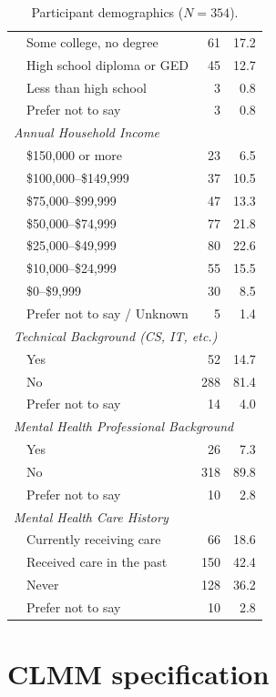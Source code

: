 \documentclass[letterpaper,twocolumn,10pt]{article}
\begin{document}
\begin{table}[htbp]
\begin{tabular}{llrr}
 & Some college, no degree & 61 & 17.2 \\
 & High school diploma or GED & 45 & 12.7 \\
 & Less than high school & 3 & 0.8 \\
 & Prefer not to say & 3 & 0.8 \\
\midrule
\multicolumn{4}{l}{\textit{Annual Household Income}} \\
 & \$150,000 or more & 23 & 6.5 \\
 & \$100,000--\$149,999 & 37 & 10.5 \\
 & \$75,000--\$99,999 & 47 & 13.3 \\
 & \$50,000--\$74,999 & 77 & 21.8 \\
 & \$25,000--\$49,999 & 80 & 22.6 \\
 & \$10,000--\$24,999 & 55 & 15.5 \\
 & \$0--\$9,999 & 30 & 8.5 \\
 & Prefer not to say / Unknown & 5 & 1.4 \\
\midrule
\multicolumn{4}{l}{\textit{Technical Background (CS, IT, etc.)}} \\
 & Yes & 52 & 14.7 \\
 & No & 288 & 81.4 \\
 & Prefer not to say & 14 & 4.0 \\
\midrule
\multicolumn{4}{l}{\textit{Mental Health Professional Background}} \\
 & Yes & 26 & 7.3 \\
 & No & 318 & 89.8 \\
 & Prefer not to say & 10 & 2.8 \\
\midrule
\multicolumn{4}{l}{\textit{Mental Health Care History}} \\
 & Currently receiving care & 66 & 18.6 \\
 & Received care in the past & 150 & 42.4 \\
 & Never & 128 & 36.2 \\
 & Prefer not to say & 10 & 2.8 \\
\bottomrule[1pt]
\end{tabular}
\caption{Participant demographics ($N = 354$).}
\label{sec:demographics-full}
\end{table}

\section{CLMM specification}
\label{sec:clmm-appendix}
\end{document}
